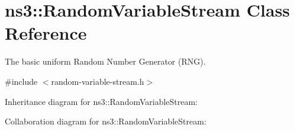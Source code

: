 \hypertarget{classns3_1_1RandomVariableStream}{}\section{ns3\+:\+:Random\+Variable\+Stream Class Reference}
\label{classns3_1_1RandomVariableStream}


The basic uniform Random Number Generator (R\+NG).  




{\ttfamily \#include $<$random-\/variable-\/stream.\+h$>$}



Inheritance diagram for ns3\+:\+:Random\+Variable\+Stream\+:


Collaboration diagram for ns3\+:\+:Random\+Variable\+Stream\+:
